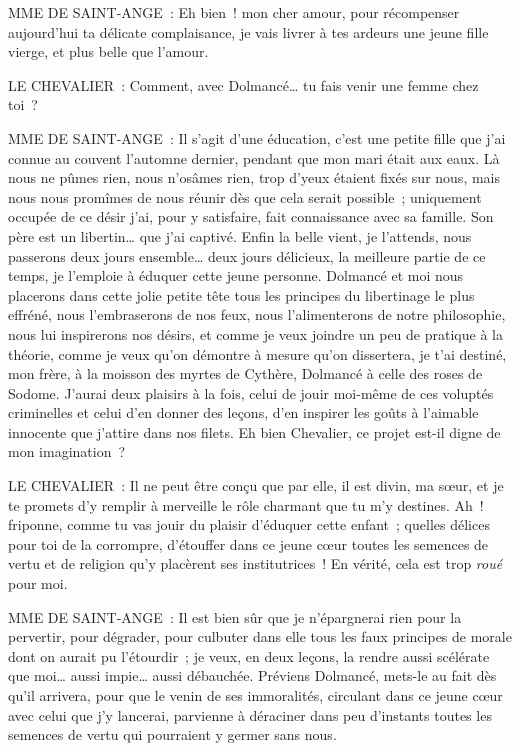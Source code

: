 \documentclass[french,twoside]{book} %
\begin{document}
MME DE SAINT-ANGE : Eh bien ! mon cher amour, pour récompenser aujourd’hui ta délicate complaisance, je vais livrer à tes ardeurs une jeune fille vierge, et plus belle que l’amour.\par
LE CHEVALIER : Comment, avec Dolmancé… tu fais venir une femme chez toi ?\par
MME DE SAINT-ANGE : Il s’agit d’une éducation, c’est une petite fille que j’ai connue au couvent l’automne dernier, pendant que mon mari était aux eaux. Là nous ne pûmes rien, nous n’osâmes rien, trop d’yeux étaient fixés sur nous, mais nous nous promîmes de nous réunir dès que cela serait possible ; uniquement occupée de ce désir j’ai, pour y satisfaire, fait connaissance avec sa famille. Son père est un libertin… que j’ai captivé. Enfin la belle vient, je l’attends, nous passerons deux jours ensemble… deux jours délicieux, la meilleure partie de ce temps, je l’emploie à éduquer cette jeune personne. Dolmancé et moi nous placerons dans cette jolie petite tête tous les principes du libertinage le plus effréné, nous l’embraserons de nos feux, nous l’alimenterons de notre philosophie, nous lui inspirerons nos désirs, et comme je veux joindre un peu de pratique à la théorie, comme je veux qu’on démontre à mesure qu’on dissertera, je t’ai destiné, mon frère, à la moisson des myrtes de Cythère, Dolmancé à celle des roses de Sodome. J’aurai deux plaisirs à la fois, celui de jouir moi-même de ces voluptés criminelles et celui d’en donner des leçons, d’en inspirer les goûts à l’aimable innocente que j’attire dans nos filets. Eh bien Chevalier, ce projet est-il digne de mon imagination ?\par
LE CHEVALIER : Il ne peut être conçu que par elle, il est divin, ma sœur, et je te promets d’y remplir à merveille le rôle charmant que tu m’y destines. Ah ! friponne, comme tu vas jouir du plaisir d’éduquer cette enfant ; quelles délices pour toi de la corrompre, d’étouffer dans ce jeune cœur toutes les semences de vertu et de religion qu’y placèrent ses institutrices ! En vérité, cela est trop {\itshape roué} pour moi.\par
MME DE SAINT-ANGE : Il est bien sûr que je n’épargnerai rien pour la pervertir, pour dégrader, pour culbuter dans elle tous les faux principes de morale dont on aurait pu l’étourdir ; je veux, en deux leçons, la rendre aussi scélérate que moi… aussi impie… aussi débauchée. Préviens Dolmancé, mets-le au fait dès qu’il arrivera, pour que le venin de ses immoralités, circulant dans ce jeune cœur avec celui que j’y lancerai, parvienne à déraciner dans peu d’instants toutes les semences de vertu qui pourraient y germer sans nous.\par
\end{document}
